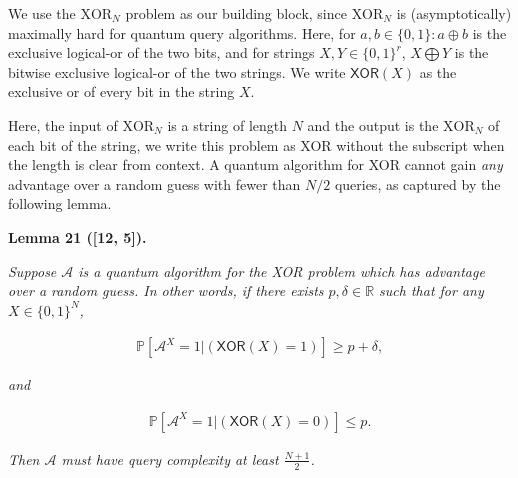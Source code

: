 \documentclass[10pt,a4paper]{article}
\begin{document}




We use the ${\text{XOR}}_{N}$ problem as our building block, since ${\text{XOR}}_{N}$ is (asymptotically) maximally hard for quantum query algorithms. Here, for $a,b\in\{0,1\}:a\oplus b$ is the exclusive logical-or of the two bits, and for strings $X,Y\in\{0,1\}^{r}$, $X\bigoplus Y$ is the bitwise exclusive logical-or of the two strings. We write $\mathsf{XOR}(X)$ as the exclusive or of every bit in the string $X$.\par




Here, the input of ${\text{XOR}}_{N}$ is a string of length $N$ and the output is the ${\text{XOR}}_{N}$ of each bit of the string, we write this problem as XOR without the subscript when the length is clear from context. A quantum algorithm for XOR cannot gain \emph{any} advantage over a random guess with fewer than $N/2$ queries, as captured by the following lemma.\par





\par\medskip\noindent\textbf{
\textbf{Lemma 21}\textbf{ }([12, 5])\textbf{.}
}\par



\emph{Suppose $\mathcal{A}$ is a quantum algorithm for the XOR problem which has advantage over a random guess. In other words, if there exists $p,\delta\in\mathbb{R}$ such that for any $X\in\{0,1\}^{N}$,}\par


\[\begin{gathered}
\mathbb{P}[\mathcal{A}^{X}=1|(\mathsf{XOR}(X)=1)]\geq p+\delta,
\end{gathered}\]


\emph{and}\par


\[\begin{gathered}
\mathbb{P}[\mathcal{A}^{X}=1|(\mathsf{XOR}(X)=0)]\leq p.
\end{gathered}\]


\emph{Then $\mathcal{A}$ must have query complexity at least $\frac{N+1}{2}$.}\par



\end{document}
